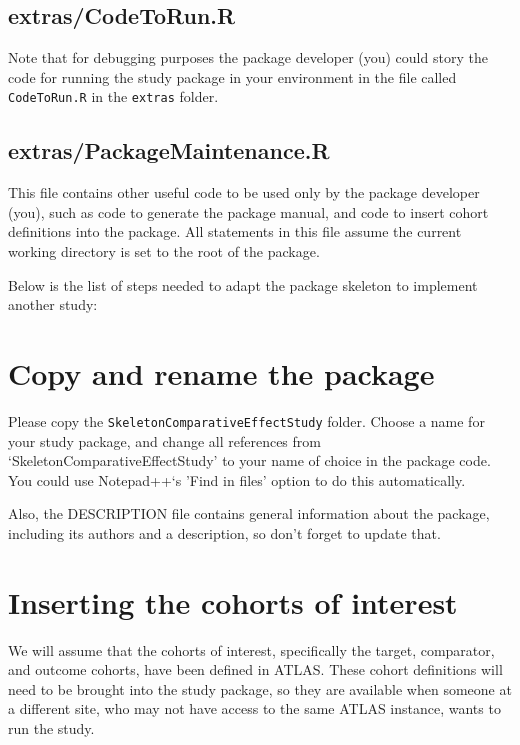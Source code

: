 \documentclass[]{article}
\begin{document}
\hypertarget{extrascodetorun.r}{%
\subsection{extras/CodeToRun.R}\label{extrascodetorun.r}}

Note that for debugging purposes the package developer (you) could story
the code for running the study package in your environment in the file
called \texttt{CodeToRun.R} in the \texttt{extras} folder.

\hypertarget{extraspackagemaintenance.r}{%
\subsection{extras/PackageMaintenance.R}\label{extraspackagemaintenance.r}}

This file contains other useful code to be used only by the package
developer (you), such as code to generate the package manual, and code
to insert cohort definitions into the package. All statements in this
file assume the current working directory is set to the root of the
package.

Below is the list of steps needed to adapt the package skeleton to
implement another study:

\hypertarget{copy-and-rename-the-package}{%
\section{Copy and rename the
package}\label{copy-and-rename-the-package}}

Please copy the \texttt{SkeletonComparativeEffectStudy} folder. Choose a
name for your study package, and change all references from
`SkeletonComparativeEffectStudy' to your name of choice in the package
code. You could use Notepad++`s 'Find in files' option to do this
automatically.

Also, the DESCRIPTION file contains general information about the
package, including its authors and a description, so don't forget to
update that.

\hypertarget{inserting-the-cohorts-of-interest}{%
\section{Inserting the cohorts of
interest}\label{inserting-the-cohorts-of-interest}}

We will assume that the cohorts of interest, specifically the target,
comparator, and outcome cohorts, have been defined in ATLAS. These
cohort definitions will need to be brought into the study package, so
they are available when someone at a different site, who may not have
access to the same ATLAS instance, wants to run the study.
\end{document}
